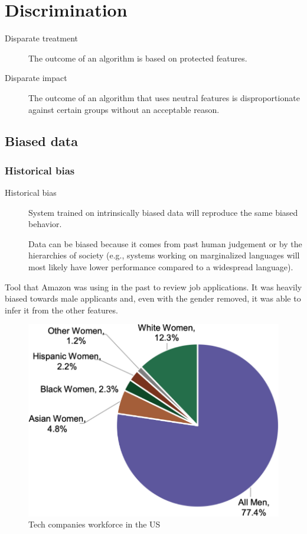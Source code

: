 \chapter{Discrimination}

\begin{description}
    \item[Disparate treatment] 
        The outcome of an algorithm is based on protected features.

    \item[Disparate impact] 
        The outcome of an algorithm that uses neutral features is disproportionate against certain groups without an acceptable reason.
\end{description}


\section{Biased data}


\subsection{Historical bias}

\begin{description}
    \item[Historical bias] 
        System trained on intrinsically biased data will reproduce the same biased behavior.

        \begin{remark}
            Data can be biased because it comes from past human judgement or by the hierarchies of society (e.g., systems working on marginalized languages will most likely have lower performance compared to a widespread language).
        \end{remark}
\end{description}

\begin{example}
    Tool that Amazon was using in the past to review job applications. It was heavily biased towards male applicants and, even with the gender removed, it was able to infer it from the other features.

    \begin{figure}[H]
        \centering
        \includegraphics[width=0.3\linewidth]{./img/tech_workforce.png}
        \caption{Tech companies workforce in the US}
    \end{figure}
\end{example}

